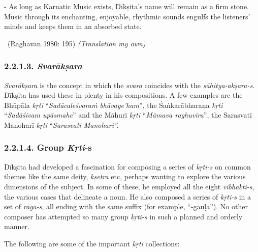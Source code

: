 \begin{myquote}
- As long as Karnatic Music exists, Dīkṣita’s name will remain as a firm stone. Music through its enchanting, enjoyable, rhythmic sounds engulfs the listeners’ minds and keeps them in an absorbed state. 

~\hfill (Raghavan 1980: 195) \textit{(Translation my own)}
\end{myquote}


\subsubsection*{2.2.1.3. \textit{Svarākṣara}}

\textit{Svarākṣara} is the concept in which the \textit{svara} coincides with the \textit{sāhitya-akṣara-s}. Dīkṣita has used these in plenty in his compositions. A few examples are the Bhūpāla \textit{kṛti} “\textit{Sadācaleśvaraṁ bhāvaye’ham}”, the Śaṅkarābharaṇa \textit{kṛti} “\textit{Sadāśivam upāsmahe}” and the Māhurī \textit{kṛti} “\textit{Māmava raghuvīra}”, the Sarasvatī Manoharī \textit{kṛti} “\textit{Sarasvati Manohari”.}


\subsubsection*{2.2.1.4. Group \textit{Kṛti}-s}

Dīkṣita had developed a fascination for composing a series of \textit{kṛti-s} on common themes like the same deity, \textit{kṣetra} etc, perhaps wanting to explore the various dimensions of the subject. In some of these, he employed all the eight \textit{vibhakti-s}, the various cases that delineate a noun. He also composed a series of \textit{kṛti-s} in a set of \textit{rāga-s}, all ending with the same suffix (for example, “-gauḷa”). No other composer has attempted so many group \textit{kṛti-s} in such a planned and orderly manner.

The following are some of the important \textit{kṛti} collections:

